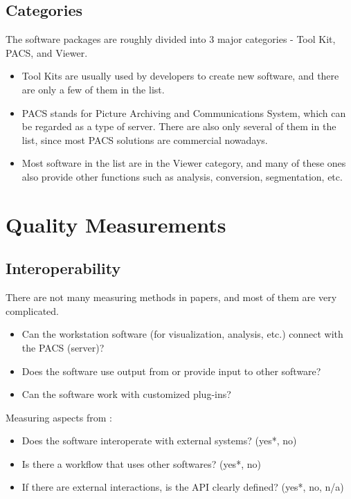 \documentclass{article}
\begin{document}
\subsection{Categories}

The software packages are roughly divided into 3 major categories - Tool Kit, PACS, and Viewer.
\begin{itemize}
    \item Tool Kits are usually used by developers to create new software, and there are only a few of them in the list. 
    \item PACS stands for Picture Archiving and Communications System, which can be regarded as a type of server. There are also only several of them in the list, since most PACS solutions are commercial nowadays.
    \item  Most software in the list are in the Viewer category, and many of these ones also provide other functions such as analysis, conversion, segmentation, etc.
\end{itemize}

\section{Quality Measurements}

\subsection{Interoperability}
There are not many measuring methods in papers, and most of them are very
complicated.
\begin{itemize}
\item Can the workstation software (for visualization, analysis, etc.) connect
with the PACS (server)?
    \item Does the software use output from or provide input to other software?
    \item Can the software work with customized plug-ins? 
\end{itemize}

\noindent Measuring aspects from \citep{SmithEtAl2018}:
\begin{itemize}
    \item Does the software interoperate with external systems? ({yes*, no})
    \item Is there a workflow that uses other softwares? ({yes*, no})
\item If there are external interactions, is the API clearly defined? ({yes*,
no, n/a})
\end{itemize}
\end{document}
